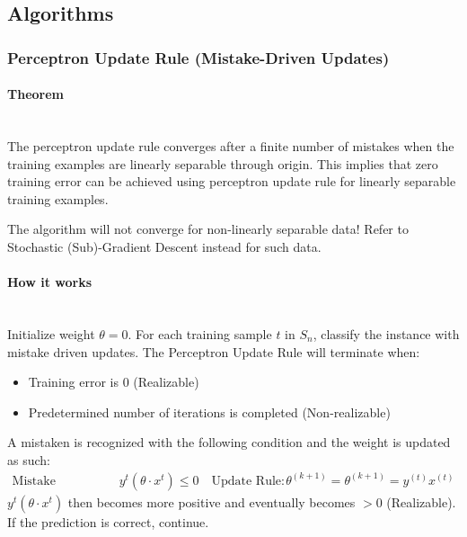 \documentclass[a4paper]{article}
\begin{document}
\subsection{Algorithms}
\subsubsection{Perceptron Update Rule (Mistake-Driven Updates)}
\paragraph{Theorem}\mbox{}\\
The perceptron update rule converges after a finite number of mistakes when the training examples are linearly separable through origin. This implies that zero training error can be achieved using perceptron update rule for linearly separable training examples.
\begin{framed}
	\begin{displayquote}
		The algorithm will not converge for non-linearly separable data! Refer to Stochastic (Sub)-Gradient Descent instead for such data.
	\end{displayquote}
\end{framed}
\paragraph{How it works}\mbox{}\\
Initialize weight $\theta = 0$. For each training sample $t$ in $S_n$, classify the instance with mistake driven updates. The Perceptron Update Rule will terminate when:
\begin{itemize}
	\item Training error is 0 (Realizable)
	\item Predetermined number of iterations is completed (Non-realizable)
\end{itemize}
A mistaken is recognized with the following condition and the weight is updated as such: $$\begin{aligned} \text{Mistake Condition: } &y^t(\theta\cdot x^t) \leq 0 \quad \text{Update Rule:} &\theta^{(k+1)} = \theta^{(k+1)} = y^{(t)}x^{(t)} \end{aligned}$$
$y^t(\theta\cdot x^t)$ then becomes more positive and eventually becomes $> 0$ (Realizable). If the prediction is correct, continue.
\end{document}
